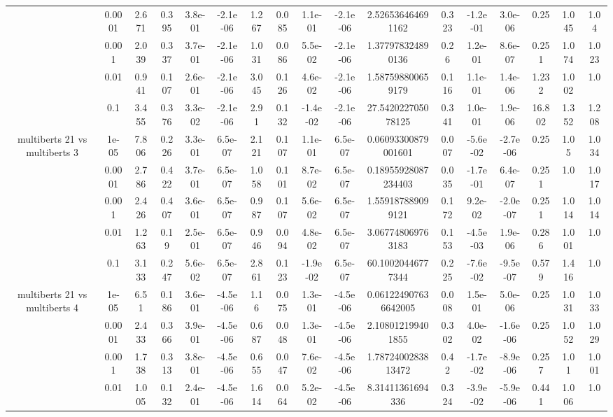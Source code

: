 \begin{tabular}{|c|c|c|c|c|c|c|c|c|c|c|c|c|c|c|c|c|}
 & 0.0001 & 2.671 & 0.395 & 3.8e-01 & -2.1e-06 & 1.267 & 0.085 & 1.1e-01 & -2.1e-06 & 2.526536464691162 & 0.323 & -1.2e-01 & 3.0e-06 & 0.25 & 1.045 & 1.04 \\
 & 0.001 & 2.039 & 0.337 & 3.7e-01 & -2.1e-06 & 1.031 & 0.086 & 5.5e-02 & -2.1e-06 & 1.377978324890136 & 0.26 & 1.2e-01 & 8.6e-07 & 0.251 & 1.074 & 1.023 \\
 & 0.01 & 0.941 & 0.107 & 2.6e-01 & -2.1e-06 & 3.045 & 0.126 & 4.6e-02 & -2.1e-06 & 1.587598800659179 & 0.116 & 1.1e-01 & 1.4e-06 & 1.232 & 1.002 & 1.0 \\
 & 0.1 & 3.455 & 0.376 & 3.3e-02 & -2.1e-06 & 2.91 & 0.132 & -1.4e-02 & -2.1e-06 & 27.542022705078125 & 0.341 & 1.0e-01 & 1.9e-06 & 16.802 & 1.352 & 1.208 \\
\hline
\multirow{5}{*}{multiberts 21 vs multiberts 3} & 1e-05 & 7.806 & 0.226 & 3.3e-01 & 6.5e-07 & 2.121 & 0.107 & 1.1e-01 & 6.5e-07 & 0.06093300879001601 & 0.007 & -5.6e-02 & -2.7e-06 & 0.25 & 1.05 & 1.034 \\
 & 0.0001 & 2.786 & 0.422 & 3.7e-01 & 6.5e-07 & 1.058 & 0.101 & 8.7e-02 & 6.5e-07 & 0.18955928087234403 & 0.035 & -1.7e-01 & 6.4e-07 & 0.251 & 1.0 & 1.017 \\
 & 0.001 & 2.426 & 0.407 & 3.6e-01 & 6.5e-07 & 0.987 & 0.107 & 5.6e-02 & 6.5e-07 & 1.559187889099121 & 0.172 & 9.2e-02 & -2.0e-07 & 0.251 & 1.014 & 1.014 \\
 & 0.01 & 1.263 & 0.19 & 2.5e-01 & 6.5e-07 & 0.946 & 0.094 & 4.8e-02 & 6.5e-07 & 3.067748069763183 & 0.153 & -4.5e-03 & 1.9e-06 & 0.286 & 1.001 & 1.0 \\
 & 0.1 & 3.133 & 0.247 & 5.6e-02 & 6.5e-07 & 2.861 & 0.123 & -1.9e-02 & 6.5e-07 & 60.10020446777344 & 0.225 & -7.6e-02 & -9.5e-07 & 0.579 & 1.416 & 1.0 \\
\hline
\multirow{5}{*}{multiberts 21 vs multiberts 4} & 1e-05 & 6.51 & 0.186 & 3.6e-01 & -4.5e-06 & 1.16 & 0.075 & 1.3e-01 & -4.5e-06 & 0.061224907636642005 & 0.008 & 1.5e-01 & 5.0e-06 & 0.25 & 1.031 & 1.033 \\
 & 0.0001 & 2.433 & 0.366 & 3.9e-01 & -4.5e-06 & 0.687 & 0.048 & 1.3e-01 & -4.5e-06 & 2.108012199401855 & 0.302 & 4.0e-02 & -1.6e-06 & 0.25 & 1.052 & 1.029 \\
 & 0.001 & 1.738 & 0.313 & 3.8e-01 & -4.5e-06 & 0.655 & 0.047 & 7.6e-02 & -4.5e-06 & 1.7872400283813472 & 0.42 & -1.7e-02 & -8.9e-06 & 0.257 & 1.01 & 1.001 \\
 & 0.01 & 1.005 & 0.132 & 2.4e-01 & -4.5e-06 & 1.614 & 0.064 & 5.2e-02 & -4.5e-06 & 8.31411361694336 & 0.324 & -3.9e-02 & -5.9e-06 & 0.441 & 1.006 & 1.0 \\

\end{tabular}
